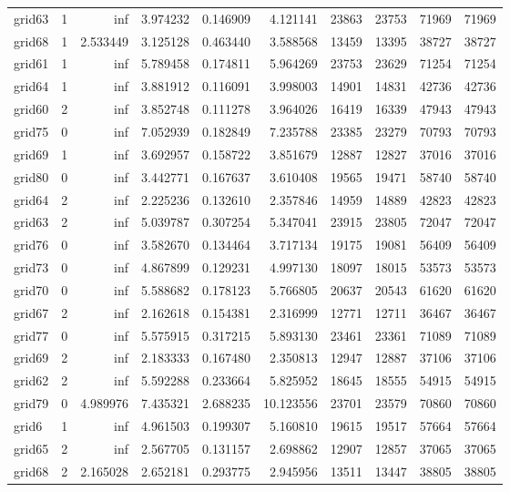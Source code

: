 \begin{longtable}{|l|r|r|r|r|r|r|r|r|r|}
grid63 & 1 & inf & 3.974232 & 0.146909 & 4.121141 & 23863 & 23753 & 71969 & 71969 \\
grid68 & 1 & 2.533449 & 3.125128 & 0.463440 & 3.588568 & 13459 & 13395 & 38727 & 38727 \\
grid61 & 1 & inf & 5.789458 & 0.174811 & 5.964269 & 23753 & 23629 & 71254 & 71254 \\
grid64 & 1 & inf & 3.881912 & 0.116091 & 3.998003 & 14901 & 14831 & 42736 & 42736 \\
grid60 & 2 & inf & 3.852748 & 0.111278 & 3.964026 & 16419 & 16339 & 47943 & 47943 \\
grid75 & 0 & inf & 7.052939 & 0.182849 & 7.235788 & 23385 & 23279 & 70793 & 70793 \\
grid69 & 1 & inf & 3.692957 & 0.158722 & 3.851679 & 12887 & 12827 & 37016 & 37016 \\
grid80 & 0 & inf & 3.442771 & 0.167637 & 3.610408 & 19565 & 19471 & 58740 & 58740 \\
grid64 & 2 & inf & 2.225236 & 0.132610 & 2.357846 & 14959 & 14889 & 42823 & 42823 \\
grid63 & 2 & inf & 5.039787 & 0.307254 & 5.347041 & 23915 & 23805 & 72047 & 72047 \\
grid76 & 0 & inf & 3.582670 & 0.134464 & 3.717134 & 19175 & 19081 & 56409 & 56409 \\
grid73 & 0 & inf & 4.867899 & 0.129231 & 4.997130 & 18097 & 18015 & 53573 & 53573 \\
grid70 & 0 & inf & 5.588682 & 0.178123 & 5.766805 & 20637 & 20543 & 61620 & 61620 \\
grid67 & 2 & inf & 2.162618 & 0.154381 & 2.316999 & 12771 & 12711 & 36467 & 36467 \\
grid77 & 0 & inf & 5.575915 & 0.317215 & 5.893130 & 23461 & 23361 & 71089 & 71089 \\
grid69 & 2 & inf & 2.183333 & 0.167480 & 2.350813 & 12947 & 12887 & 37106 & 37106 \\
grid62 & 2 & inf & 5.592288 & 0.233664 & 5.825952 & 18645 & 18555 & 54915 & 54915 \\
grid79 & 0 & 4.989976 & 7.435321 & 2.688235 & 10.123556 & 23701 & 23579 & 70860 & 70860 \\
grid6 & 1 & inf & 4.961503 & 0.199307 & 5.160810 & 19615 & 19517 & 57664 & 57664 \\
grid65 & 2 & inf & 2.567705 & 0.131157 & 2.698862 & 12907 & 12857 & 37065 & 37065 \\
grid68 & 2 & 2.165028 & 2.652181 & 0.293775 & 2.945956 & 13511 & 13447 & 38805 & 38805 \\

\end{longtable}
